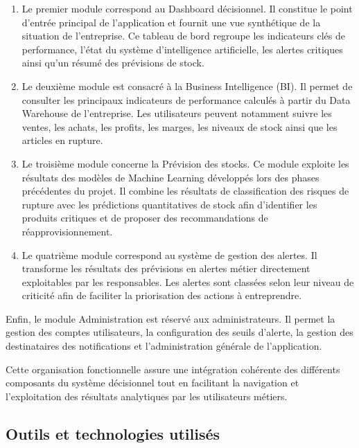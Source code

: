 \begin{enumerate}
    \item Le premier module correspond au Dashboard décisionnel. Il constitue le point d'entrée principal de l'application et fournit une vue synthétique de la situation de l'entreprise. Ce tableau de bord regroupe les indicateurs clés de performance, l'état du système d'intelligence artificielle, les alertes critiques ainsi qu'un résumé des prévisions de stock.
    
    \item Le deuxième module est consacré à la Business Intelligence (BI). Il permet de consulter les principaux indicateurs de performance calculés à partir du Data Warehouse de l'entreprise. Les utilisateurs peuvent notamment suivre les ventes, les achats, les profits, les marges, les niveaux de stock ainsi que les articles en rupture.
    
    \item Le troisième module concerne la Prévision des stocks. Ce module exploite les résultats des modèles de Machine Learning développés lors des phases précédentes du projet. Il combine les résultats de classification des risques de rupture avec les prédictions quantitatives de stock afin d'identifier les produits critiques et de proposer des recommandations de réapprovisionnement.
    
    \item Le quatrième module correspond au système de gestion des alertes. Il transforme les résultats des prévisions en alertes métier directement exploitables par les responsables. Les alertes sont classées selon leur niveau de criticité afin de faciliter la priorisation des actions à entreprendre.
\end{enumerate}

Enfin, le module Administration est réservé aux administrateurs. Il permet la gestion des comptes utilisateurs, la configuration des seuils d'alerte, la gestion des destinataires des notifications et l'administration générale de l'application.

Cette organisation fonctionnelle assure une intégration cohérente des différents composants du système décisionnel tout en facilitant la navigation et l'exploitation des résultats analytiques par les utilisateurs métiers.

\subsection{Outils et technologies utilisés}

